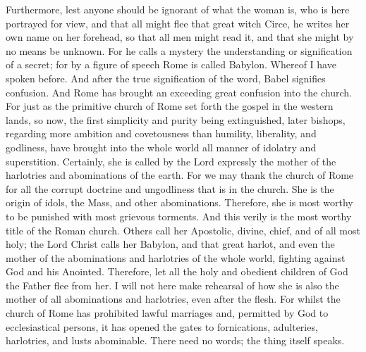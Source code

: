 Furthermore, lest anyone should be ignorant of what the woman is, who is here portrayed for view, and that all might flee that great witch Circe, he writes her own name on her forehead, so that all men might read it, and that she might by no means be unknown. For he calls a mystery the understanding or signification of a secret; for by a figure of speech Rome is called Babylon. Whereof I have spoken before. And after the true signification of the word, Babel signifies confusion. And Rome has brought an exceeding great confusion into the church. For just as the primitive church of Rome set forth the gospel in the western lands, so now, the first simplicity and purity being extinguished, later bishops, regarding more ambition and covetousness than humility, liberality, and godliness, have brought into the whole world all manner of idolatry and superstition. Certainly, she is called by the Lord expressly the mother of the harlotries and abominations of the earth. For we may thank the church of Rome for all the corrupt doctrine and ungodliness that is in the church. She is the origin of idols, the Mass, and other abominations. Therefore, she is most worthy to be punished with most grievous torments. And this verily is the most worthy title of the Roman church. Others call her Apostolic, divine, chief, and of all most holy; the Lord Christ calls her Babylon, and that great harlot, and even the mother of the abominations and harlotries of the whole world, fighting against God and his Anointed. Therefore, let all the holy and obedient children of God the Father flee from her. I will not here make rehearsal of how she is also the mother of all abominations and harlotries, even after the flesh. For whilst the church of Rome has prohibited lawful marriages and, permitted by God to ecclesiastical persons, it has opened the gates to fornications, adulteries, harlotries, and lusts abominable. There need no words; the thing itself speaks.

